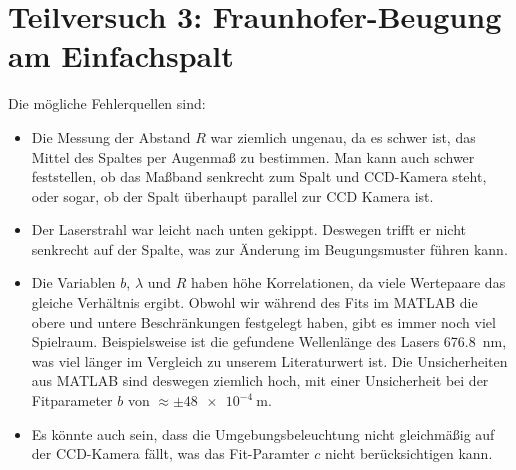 \section{Teilversuch 3: Fraunhofer-Beugung am Einfachspalt}
	Die mögliche Fehlerquellen sind:
	\begin{itemize}
		\item Die Messung der Abstand $R$ war ziemlich ungenau, da es schwer ist, das Mittel des Spaltes per Augenmaß zu bestimmen. Man kann auch schwer feststellen, ob das Maßband senkrecht zum Spalt und CCD-Kamera steht, oder sogar, ob der Spalt überhaupt parallel zur CCD Kamera ist. 
		\item Der Laserstrahl war leicht nach unten gekippt. Deswegen trifft er nicht senkrecht auf der Spalte, was zur Änderung im Beugungsmuster führen kann. 
		\item Die Variablen $b$, $\lambda$ und $R$ haben höhe Korrelationen, da viele Wertepaare das gleiche Verhältnis ergibt. Obwohl wir während des Fits im MATLAB die obere und untere Beschränkungen festgelegt haben, gibt es immer noch viel Spielraum. Beispielsweise ist die gefundene Wellenlänge des Lasers \SI{676.8}{\nano\meter}, was viel länger im Vergleich zu unserem Literaturwert ist. Die Unsicherheiten aus MATLAB sind deswegen ziemlich hoch, mit einer Unsicherheit bei der Fitparameter $b$ von $\approx \pm \SI{48e-4}{\meter}$.
		\item Es könnte auch sein, dass die Umgebungsbeleuchtung nicht gleichmäßig auf der CCD-Kamera fällt, was das Fit-Paramter $c$ nicht berücksichtigen kann.
	\end{itemize}